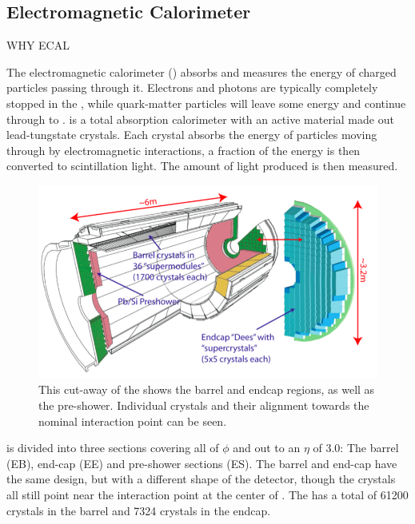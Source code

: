 \subsection{Electromagnetic Calorimeter}
WHY ECAL

The electromagnetic calorimeter (\ECAL) absorbs and measures the energy of charged particles passing through it. Electrons and photons are typically completely stopped in the \ECAL, while quark-matter particles will leave some energy and continue through to \HCAL. \ECAL is a total absorption calorimeter with an active material made out lead-tungstate crystals. Each crystal absorbs the energy of particles moving through by electromagnetic interactions, a fraction of the energy is then converted to scintillation light. The amount of light produced is then measured.

\begin{figure}[!tp]
    \centering
    \includegraphics[width=\textwidth]{figures/ECAL_diag.png}
    \caption[
       \CMS \ECAL diagram.
    ]{
        This cut-away of the \ECAL shows the barrel and endcap regions, as well as the pre-shower. Individual crystals and their alignment towards the nominal interaction point can be seen. \cite{ecalPerf}
    }
    \label{fig:ecal}
\end{figure}

\ECAL is divided into three sections covering all of \ensuremath{\phi} and out to an \ensuremath{\eta} of 3.0: The barrel (EB), end-cap (EE) and pre-shower sections (ES).  The barrel and end-cap have the same design, but with a different shape of the detector, though the crystals all still point near the interaction point at the center of \CMS. The \ECAL has a total of 61200 crystals in the barrel and 7324 crystals in the endcap. 

